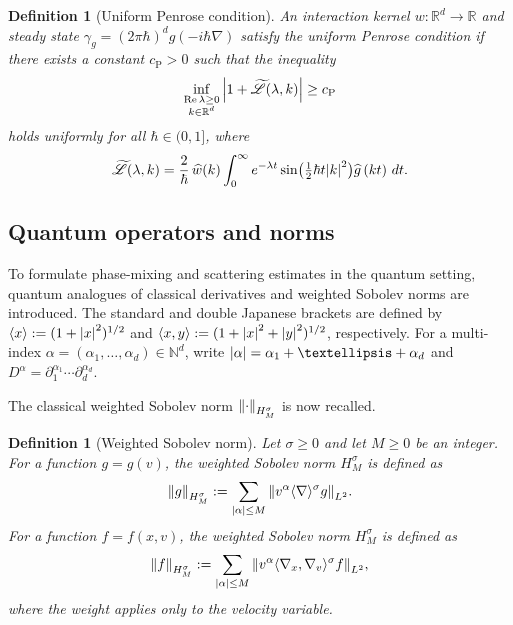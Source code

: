 \documentclass[10pt,a4paper]{article}
\theoremstyle{plain}
\newtheorem{definition}[theorem]{Definition}
\theoremstyle{remark}
\newcommand{\br}[1]{\left(#1\right)}
\newcommand{\bbr}[1]{\bigl(#1 \bigr)}
\newcommand{\ak}{\abs{k}}
\newcommand{\aal}{\abs{\alpha}}
\newcommand{\p}{\partial}
\newcommand{\jb}[1]{\langle#1\rangle}
\newcommand{\R}{\mathbb{R}}
\newcommand{\lam}{\lambda}
\begin{document}
\begin{definition}[Uniform Penrose condition]
An interaction kernel \(w\colon \R^d \to \R\) and steady state \(\gamma_g = (2\pi\hbar)^d g(-i\hbar\nabla)\) satisfy the uniform Penrose condition if there exists a constant \({c_{\mathrm{P}}} > 0\) such that the inequality
\begin{align}\label{Penrose}
\inf_{\substack{\Re\lambda \geq 0 \\ k \in \R^d}} \abs{1 + \widetilde{\mathscr{L}}(\lambda, k)} \geq {c_{\mathrm{P}}}
\end{align}
holds uniformly for all \(\hbar \in (0,1]\), where
\[
\widetilde{\mathscr{L}}(\lambda, k) = \frac{2}{\hbar}\, \widehat{w}(k) \int_0^\infty e^{-\lam t}\sin\bbr{\tfrac{1}{2}\hbar t \ak^2} \widehat{g}\br{kt}\,dt.
\]

\end{definition}

\subsection{Quantum operators and norms} To formulate phase-mixing and scattering estimates in the quantum setting, quantum analogues of classical derivatives and weighted Sobolev norms are introduced. The standard and double Japanese brackets are defined by $\jb{x}:=(1+\abs{x}^2)^{1/2}$ and $\jb{x,y}:=(1+\abs{x}^2+\abs{y}^2)^{1/2}$, respectively. For a multi-index $\alpha=(\alpha_1,\dots,\alpha_d)\in\mathbb N^d$, write
$\abs{\alpha}=\alpha_1+\dots+\alpha_d$ and $D^{\alpha}=\p_1^{\alpha_1}\cdots\p_d^{\alpha_d}$.

The classical weighted Sobolev norm $\norm{\cdot}_{H^\sigma_M}$ is now recalled.

\begin{definition}[Weighted Sobolev norm]
Let $\sigma\geq0$ and let $M\geq0$ be an integer. For a function $g=g(v)$, the weighted Sobolev norm $H^{\sigma}_M$ is defined as
\begin{align*}
\norm{g}_{H^{\sigma}_M}:=\sum_{\aal\leq M}\norm{v^\alpha\jb{\nabla}^\sigma g}_{L^2}.
\end{align*}
For a function $f=f(x,v)$, the weighted Sobolev norm $H^{\sigma}_{M}$ is defined as
\begin{align*}
\norm{f}_{H^{\sigma}_{M}}:=\sum_{\aal\leq M}\norm{v^\alpha \jb{\nabla_x,\nabla_v}^{\sigma}f}_{L^2},
\end{align*}where the weight applies only to the velocity variable.\end{definition}
\end{document}
